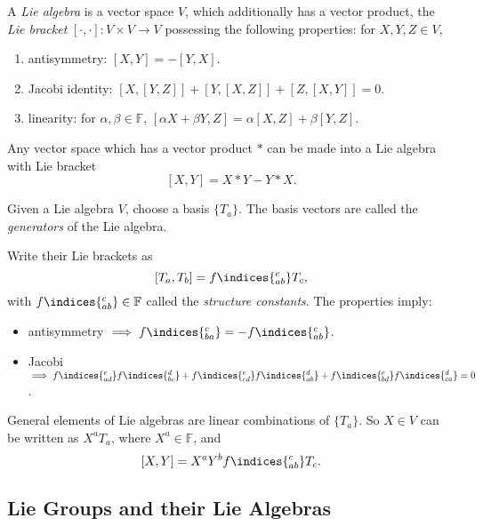 \documentclass[12pt]{article}
\begin{document}
\begin{definition}
	A \emph{Lie algebra} is a vector space $V$, which additionally has a vector product, the \emph{Lie bracket} $[\cdot, \cdot] : V \times V \to V$ possessing the following properties: for $X, Y, Z \in V$,
	\begin{enumerate}
		\item antisymmetry: $[X, Y] = -[Y, X]$.
		\item Jacobi identity: $[X, [Y, Z]] + [Y, [X, Z]] + [Z, [X, Y]] = 0$.
		\item linearity: for $\alpha, \beta \in \mathbb{F}$, $[\alpha X + \beta Y, Z] = \alpha[X, Z] + \beta[Y, Z]$.
	\end{enumerate}
\end{definition}

\begin{remark}
	Any vector space which has a vector product $\ast$ can be made into a Lie algebra with Lie bracket
	\[
		[X, Y] = X\ast Y - Y\ast X.
	\]
\end{remark}

Given a Lie algebra $V$, choose a basis $\{T_a\}$. The basis vectors are called the \emph{generators} of the Lie algebra.

Write their Lie brackets as
\[
	[T_a, T_b] = f\indices{^{c}_{ab}} T_c,
\]
with $f\indices{^{c}_{ab}} \in \mathbb{F}$ called the \emph{structure constants}. The properties imply:
\begin{itemize}
	\item antisymmetry $\implies f\indices{^{c}_{ba}} = - f\indices{^{c}_{ab}}$.
	\item Jacobi $\implies f\indices{^{e}_{ad}} f\indices{^{d}_{bc}} + f\indices{^{e}_{cd}} f\indices{^{d}_{ab}} + f\indices{^{e}_{bd}} f\indices{^{d}_{ca}} = 0$.
\end{itemize}

General elements of Lie algebras are linear combinations of $\{T_a\}$. So $X \in V$ can be written as $X^a T_a$, where $X^a \in \mathbb{F}$, and
\[
	[X, Y] = X^a Y^b f\indices{^{c}_{ab}} T_c.
\]

\subsection{Lie Groups and their Lie Algebras}%
\label{sub:lg_la}
\end{document}
